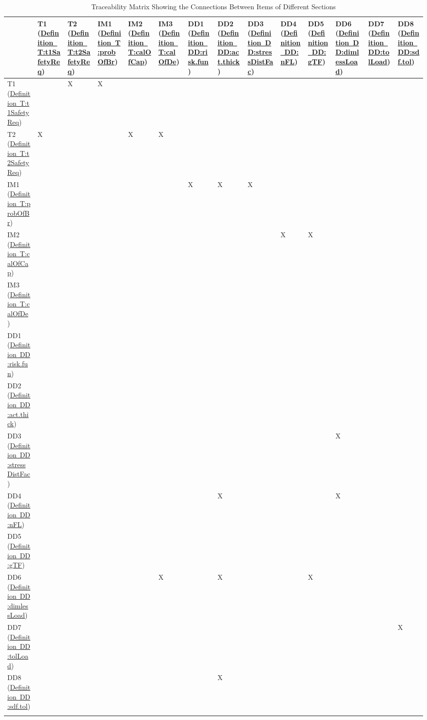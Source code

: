 \documentclass[12pt]{article}
\begin{document}
\begin{longtable}{l l l l l l l l l l l l l l}
\toprule
 & T1 (\hyperref[T:t1SafetyReq]{Definition~T:t1SafetyReq}) & T2 (\hyperref[T:t2SafetyReq]{Definition~T:t2SafetyReq}) & IM1 (\hyperref[T:probOfBr]{Definition~T:probOfBr}) & IM2 (\hyperref[T:calOfCap]{Definition~T:calOfCap}) & IM3 (\hyperref[T:calOfDe]{Definition~T:calOfDe}) & DD1 (\hyperref[DD:risk.fun]{Definition~DD:risk.fun}) & DD2 (\hyperref[DD:act.thick]{Definition~DD:act.thick}) & DD3 (\hyperref[DD:stressDistFac]{Definition~DD:stressDistFac}) & DD4 (\hyperref[DD:nFL]{Definition~DD:nFL}) & DD5 (\hyperref[DD:gTF]{Definition~DD:gTF}) & DD6 (\hyperref[DD:dimlessLoad]{Definition~DD:dimlessLoad}) & DD7 (\hyperref[DD:tolLoad]{Definition~DD:tolLoad}) & DD8 (\hyperref[DD:sdf.tol]{Definition~DD:sdf.tol})
\\
\midrule
T1 (\hyperref[T:t1SafetyReq]{Definition~T:t1SafetyReq}) &  & X & X &  &  &  &  &  &  &  &  &  & 
\\
T2 (\hyperref[T:t2SafetyReq]{Definition~T:t2SafetyReq}) & X &  &  & X & X &  &  &  &  &  &  &  & 
\\
IM1 (\hyperref[T:probOfBr]{Definition~T:probOfBr}) &  &  &  &  &  & X & X & X &  &  &  &  & 
\\
IM2 (\hyperref[T:calOfCap]{Definition~T:calOfCap}) &  &  &  &  &  &  &  &  & X & X &  &  & 
\\
IM3 (\hyperref[T:calOfDe]{Definition~T:calOfDe}) &  &  &  &  &  &  &  &  &  &  &  &  & 
\\
DD1 (\hyperref[DD:risk.fun]{Definition~DD:risk.fun}) &  &  &  &  &  &  &  &  &  &  &  &  & 
\\
DD2 (\hyperref[DD:act.thick]{Definition~DD:act.thick}) &  &  &  &  &  &  &  &  &  &  &  &  & 
\\
DD3 (\hyperref[DD:stressDistFac]{Definition~DD:stressDistFac}) &  &  &  &  &  &  &  &  &  &  & X &  & 
\\
DD4 (\hyperref[DD:nFL]{Definition~DD:nFL}) &  &  &  &  &  &  & X &  &  &  & X &  & 
\\
DD5 (\hyperref[DD:gTF]{Definition~DD:gTF}) &  &  &  &  &  &  &  &  &  &  &  &  & 
\\
DD6 (\hyperref[DD:dimlessLoad]{Definition~DD:dimlessLoad}) &  &  &  &  & X &  & X &  &  & X &  &  & 
\\
DD7 (\hyperref[DD:tolLoad]{Definition~DD:tolLoad}) &  &  &  &  &  &  &  &  &  &  &  &  & X
\\
DD8 (\hyperref[DD:sdf.tol]{Definition~DD:sdf.tol}) &  &  &  &  &  &  & X &  &  &  &  &  & 
\\
\bottomrule
\caption{Traceability Matrix Showing the Connections Between Items of Different Sections}
\label{Table:TracMatrShowtheConnBetwItemofDiffSect}
\end{longtable}
\end{document}

